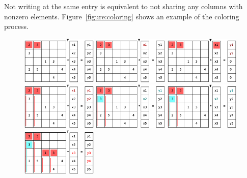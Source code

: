 \documentclass[a4paper,11pt]{scrartcl}
\begin{document}
Not writing at the same entry is equivalent to not sharing any columns with
nonzero elements. Figure~\ref{figure:coloring} shows an example of the
coloring process.


\begin{figure}[ht]
\includegraphics[width=0.32\textwidth]{graphic/coloringT2.eps}\hfill\vline\hfill
\includegraphics[width=0.32\textwidth]{graphic/coloringT3.eps}\hfill\vline\hfill
\includegraphics[width=0.32\textwidth]{graphic/coloringT4.eps}
\includegraphics[width=0.32\textwidth]{graphic/coloringT5.eps}\hfill\vline\hfill
\includegraphics[width=0.32\textwidth]{graphic/coloringT6.eps}\hfill\vline\hfill
\includegraphics[width=0.32\textwidth]{graphic/coloringT7.eps}
\includegraphics[width=0.32\textwidth]{graphic/coloringT8.eps}\hfill\vline\hfill

\end{figure}
\end{document}
